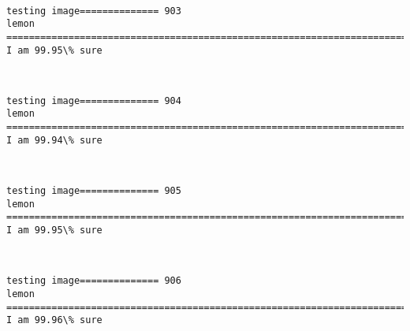 \documentclass[11pt]{article}
\begin{document}
    \begin{center}
    \end{center}
    { \hspace*{\fill} \\}
    
    \begin{Verbatim}[commandchars=\\\{\}]
testing image============== 903
lemon
============================================================================
I am 99.95\% sure

    \end{Verbatim}

    \begin{center}
    \end{center}
    { \hspace*{\fill} \\}
    
    \begin{Verbatim}[commandchars=\\\{\}]
testing image============== 904
lemon
============================================================================
I am 99.94\% sure

    \end{Verbatim}

    \begin{center}
    \end{center}
    { \hspace*{\fill} \\}
    
    \begin{Verbatim}[commandchars=\\\{\}]
testing image============== 905
lemon
============================================================================
I am 99.95\% sure

    \end{Verbatim}

    \begin{center}
    \end{center}
    { \hspace*{\fill} \\}
    
    \begin{Verbatim}[commandchars=\\\{\}]
testing image============== 906
lemon
============================================================================
I am 99.96\% sure

    \end{Verbatim}
\end{document}
